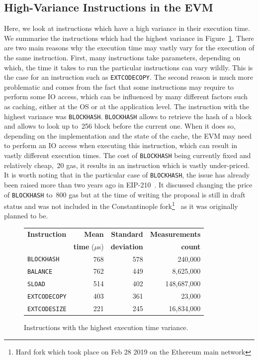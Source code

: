 \subsection{High-Variance Instructions in the EVM}
Here, we look at instructions which have a high variance in their execution time. We summarise the instructions which had the highest variance in Figure~\ref{tab:high-variance-instructions}. There are two main reasons why the execution time may vastly vary for the execution of the same instruction. First, many instructions take parameters, depending on which, the time it takes to run the particular instructions can vary wildly. This is the case for an instruction such as \lstinline{EXTCODECOPY}. The second reason is much more problematic and comes from the fact that some instructions may require to perform some IO access, which can be influenced by many different factors such as caching, either at the OS or at the application level. The instruction with the highest variance was \lstinline{BLOCKHASH}. 
\lstinline{BLOCKHASH} allows to retrieve the hash of a block and allows to look up to~256 block before the current one. When it does so, depending on the implementation and the state of the cache, the EVM may need to perform an IO access when executing this instruction, which can result in vastly different execution times. The cost of \lstinline{BLOCKHASH} being currently fixed and relatively cheap,~20 gas, it results in an instruction which is vastly under-priced. It is worth noting that in the particular case of \lstinline{BLOCKHASH}, the issue has already been raised more than two years ago in EIP-210~\cite{eip-blockhash}. It discussed changing the price of \lstinline{BLOCKHASH} to~800 gas but at the time of writing the proposal is still in draft status and was not included in the Constantinople fork\footnote{Hard fork which took place on Feb 28 2019 on the Ethereum main network}~\cite{constantinople} as it was originally planned to be.

\begin{figure}[tb]
  \centering
    \setlength{\tabcolsep}{3pt}
  \begin{tabular}{lrrr}
    \toprule
    \textbf{Instruction} & \textbf{Mean} & \textbf{Standard} & \textbf{Measurements}\\
    & \textbf{time} ($\mu$s) & \textbf{deviation} & \textbf{count}\\
    \midrule
    \texttt{BLOCKHASH} & 768 & 578 & 240,000\\
    \texttt{BALANCE} & 762 & 449 & 8,625,000\\
    \texttt{SLOAD} & 514 & 402 & 148,687,000\\
    \texttt{EXTCODECOPY} & 403 & 361 & 23,000\\
    \texttt{EXTCODESIZE} & 221 & 245 & 16,834,000\\
    \bottomrule
    \end{tabular}
    \caption{Instructions with the highest execution time variance.}
    \label{tab:high-variance-instructions}
\end{figure}

